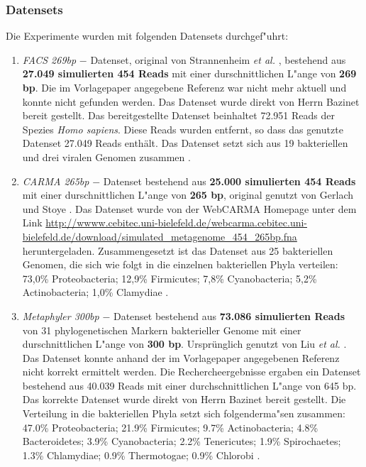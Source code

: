 \documentclass[10pt, a4paper]{article}[08.12.2015]
\begin{document}
      \subsubsection{Datensets}
        Die Experimente wurden mit folgenden Datensets durchgef"uhrt:
        
        \begin{enumerate}
        
          \item \textit{FACS 269bp} $-$ Datenset, original von Strannenheim 			  \textit{et al.} \cite{stranneheim2010}, bestehend aus
          \textbf{27.049 simulierten 454 
          Reads} mit einer durschnittlichen L"ange von \textbf{269 bp}. Die
          im Vorlagepaper angegebene Referenz war nicht mehr aktuell und
          konnte nicht gefunden werden. Das
          Datenset wurde direkt von Herrn Bazinet bereit gestellt. Das 					  bereitgestellte Datenset beinhaltet 72.951 Reads der Spezies 					  \textit{Homo sapiens}. Diese Reads wurden entfernt, so dass das 				  genutzte Datenset 27.049 Reads enth\"alt. Das Datenset setzt sich aus 		  19 bakteriellen und drei viralen Genomen zusammen 							  \cite{bazinet2012}.  
           
          \item \textit{CARMA 265bp} $-$ Datenset bestehend aus
          \textbf{25.000 simulierten 454 Reads} mit einer durschnittlichen 				  L"ange von \textbf{265 bp}, original genutzt von Gerlach und Stoye
          \cite{GerlachStoye2011}.
          Das Datenset
          wurde von der WebCARMA Homepage unter dem Link
          \url{http://wwww.cebitec.uni-bielefeld.de/webcarma.cebitec.uni-
          bielefeld.de/download/simulated_metagenome_454_265bp.fna}\newline
          heruntergeladen. Zusammengesetzt ist das Datenset aus 25 bakteriellen
          Genomen, die sich wie folgt in die einzelnen bakteriellen Phyla 				  verteilen: 73,0\% Proteobacteria; 12,9\% Firmicutes; 7,8\% 					  Cyanobacteria; 5,2\% Actinobacteria; 1,0\% Clamydiae 							  \cite{bazinet2012}.
          
          \item \textit{Metaphyler 300bp} $-$ Datenset bestehend aus 
          \textbf{73.086 simulierten
          Reads} von 31 phylogenetischen Markern bakterieller Genome mit 			  	  einer durschnittlichen L"ange von \textbf{300 bp}. Urspr\"unglich 			  genutzt von Liu \textit{et al.} \cite{Liu2010}. Das
          Datenset konnte anhand der im Vorlagepaper angegebenen Referenz nicht 
          korrekt ermittelt werden. Die Rechercheergebnisse
          ergaben ein Datenset bestehend aus 40.039 Reads mit einer 
          durchschnittlichen L"ange von 645 bp. Das korrekte
          Datenset wurde direkt von Herrn Bazinet bereit gestellt. 
          Die Verteilung in die bakteriellen Phyla setzt sich folgenderma"sen 			  zusammen: 47.0\% Proteobacteria; 21.9\% Firmicutes; 9.7\% 					  Actinobacteria; 4.8\% Bacteroidetes; 3.9\% Cyanobacteria; 2.2\% 				  Tenericutes; 1.9\% Spirochaetes; 1.3\% Chlamydiae; 0.9\% 						  Thermotogae; 0.9\% Chlorobi \cite{bazinet2012}. 
          

\end{enumerate}
\end{document}
